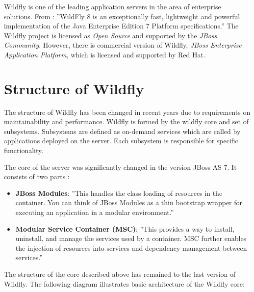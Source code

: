 \documentclass[12pt,oneside]{fithesis2}
\begin{document}
Wildfly is one of the leading application servers in the area of enterprise solutions. From \cite[Getting Started with WildFly 8]{wildfly_doc}: ''WildFly 8 is an exceptionally fast, lightweight and powerful implementation of the Java Enterprise Edition 7 Platform specifications.'' The Wildfly project is licensed as \textit{Open Source} and supported by the \textit{JBoss Community}. However, there is commercial version of Wildfly, \textit{JBoss Enterprise Application Platform}, which is licensed and supported by Red Hat.

\section{Structure of Wildfly}
The structure of Wildfly has been changed in recent years due to requirements on maintainability and performance. Wildfly is formed by the wildfly core and set of subsystems. Subsystems are defined as on-demand services which are called by applications deployed on the server. Each subsystem is responsible for specific functionality.

The core of the server was significantly changed in the version JBoss AS 7. It consists of two parts \cite{jboss_as_book}:

\begin{itemize}
	\item \textbf{JBoss Modules}: ''This handles the class loading of resources in the container.
	You can think of JBoss Modules as a thin bootstrap wrapper for executing
	an application in a modular environment.''
	\item \textbf{Modular Service Container (MSC)}: ''This provides a way to install,
	uninstall, and manage the services used by a container. MSC further
	enables the injection of resources into services and dependency
	management between services.''
\end{itemize}

The structure of the core described above has remained to the last version of Wildfly. The following diagram illustrates basic architecture of the Wildfly core:
\end{document}
